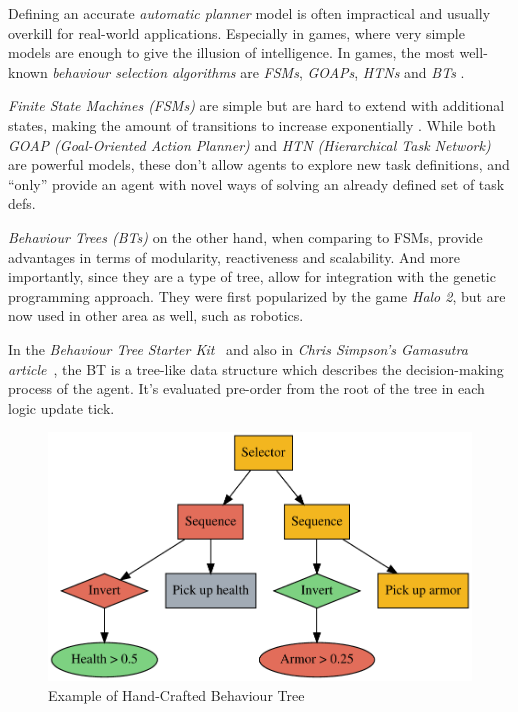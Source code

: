 \documentclass[a4paper, twocolumn]{article}
\begin{document}
        Defining an accurate \emph{automatic planner} model is often impractical and usually overkill for real-world applications. Especially in games, where very simple models are enough to give the illusion of intelligence. In games, the most well-known \emph{behaviour selection algorithms} are \emph{FSMs}, \emph{GOAPs}, \emph{HTNs} and \emph{BTs} \cite{dawe2014overview}.

        \emph{Finite State Machines (FSMs)} are simple but are hard to extend with additional states, making the amount of transitions to increase exponentially \cite{dawe2014overview}. While both \emph{GOAP (Goal-Oriented Action Planner)} and \emph{HTN (Hierarchical Task Network)} are powerful models, these don't allow agents to explore new task definitions, and ``only'' provide an agent with novel ways of solving an already defined set of task defs.

        \emph{Behaviour Trees (BTs)} on the other hand, when comparing to FSMs, provide advantages in terms of modularity, reactiveness and scalability. And more importantly, since they are a type of tree, allow for integration with the genetic programming approach. They were first popularized by the game \emph{Halo 2}, but are now used in other area as well, such as robotics.

        In the \emph{Behaviour Tree Starter Kit}~\cite{champandard2014behaviour} and also in \emph{Chris Simpson's Gamasutra article}~\cite{simpson2014behavior}, the BT is a tree-like data structure which describes the decision-making process of the agent. It's evaluated pre-order from the root of the tree in each logic update tick.

        \begin{figure}[H]
            \centering
            \includegraphics[width=\linewidth]{share/behaviour_tree.pdf}
            \caption{Example of Hand-Crafted Behaviour Tree}
            \label{fig:behaviour_tree}
        \end{figure}
\end{document}
